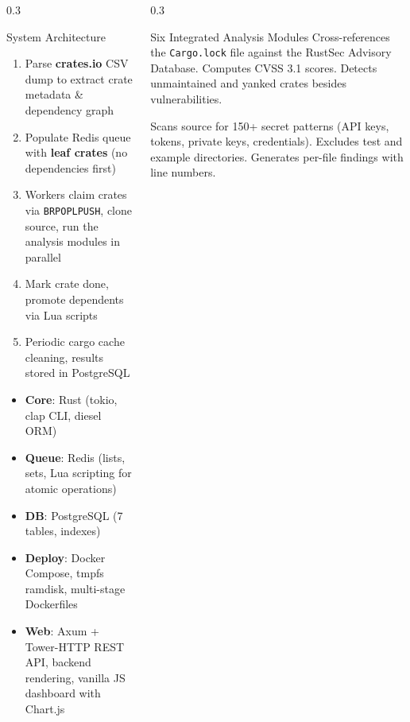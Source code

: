 \documentclass[final]{beamer}
\begin{document}
\begin{frame}[fragile]
\begin{columns}[t]
\begin{column}{0.3\paperwidth}
\begin{exampleblock}{System Architecture}
    \begin{enumerate}
        \item Parse \textbf{crates.io} CSV dump to extract crate metadata \& dependency graph
        \item Populate Redis queue with \textbf{leaf crates} (no dependencies first)
        \item Workers claim crates via \texttt{BRPOPLPUSH}, clone source, run the analysis modules in parallel
        \item Mark crate done, promote dependents via Lua scripts
        \item Periodic cargo cache cleaning, results stored in PostgreSQL
    \end{enumerate}

    \bigskip
    \begin{itemize}
        \item \textbf{Core}: Rust (tokio, clap CLI, diesel ORM)
        \item \textbf{Queue}: Redis (lists, sets, Lua scripting for atomic operations)
        \item \textbf{DB}: PostgreSQL (7 tables, indexes)
        \item \textbf{Deploy}: Docker Compose, tmpfs ramdisk, multi-stage Dockerfiles
        \item \textbf{Web}: Axum + Tower-HTTP REST API, backend rendering, vanilla JS dashboard with Chart.js
    \end{itemize}
\end{exampleblock}

\end{column}

\separatorcolumn

\begin{column}{0.3\paperwidth}

\begin{block}{Six Integrated Analysis Modules}
    Cross-references the \texttt{Cargo.lock} file against the RustSec Advisory Database.
    Computes CVSS 3.1 scores. Detects unmaintained and yanked crates besides vulnerabilities.

    \bigskip
    Scans source for 150+ secret patterns (API keys, tokens, private keys, credentials).
    Excludes test and example directories. Generates per-file findings with line numbers.


\end{block}
\end{column}
\end{columns}
\end{frame}
\end{document}
